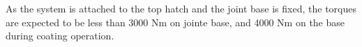 As the system is attached to the top hatch and the joint base is fixed,
the torques are expected to be less than 3000 Nm on jointe base, and 4000 Nm on
the base during coating operation.



